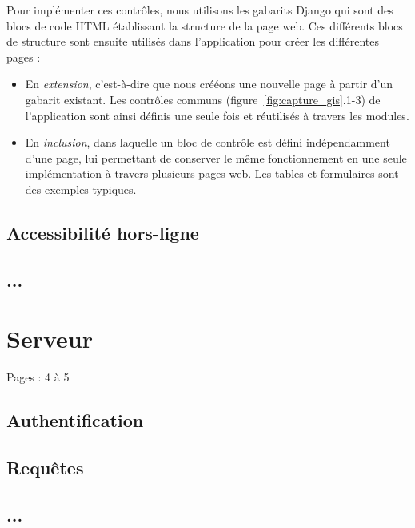 \documentclass{EPL-master-thesis-covers-FR}
\begin{document}
				Pour implémenter ces contrôles, nous utilisons les gabarits Django qui sont des blocs de code HTML établissant la structure de la page web. Ces différents blocs de structure sont ensuite utilisés dans l'application pour créer les différentes pages :
				\begin{itemize}
					\item En \emph{extension}, c'est-à-dire que nous crééons une nouvelle page à partir d'un gabarit existant. Les contrôles communs (figure~\ref{fig:capture_gis}.1-3) de l'application sont ainsi définis une seule fois et réutilisés à travers les modules.
					\item En \emph{inclusion}, dans laquelle un bloc de contrôle est défini indépendamment d'une page, lui permettant de conserver le même fonctionnement en une seule implémentation à travers plusieurs pages web. Les tables et formulaires sont des exemples typiques.
				\end{itemize}



			\subsection*{Accessibilité hors-ligne}
				\label{sec:service_worker}
			\subsection*{...}

		\section{Serveur}
			\label{sec:serveur}


			Pages : 4 à 5
			\subsection*{Authentification}
			\subsection*{Requêtes}
			\subsection*{...}
\end{document}
